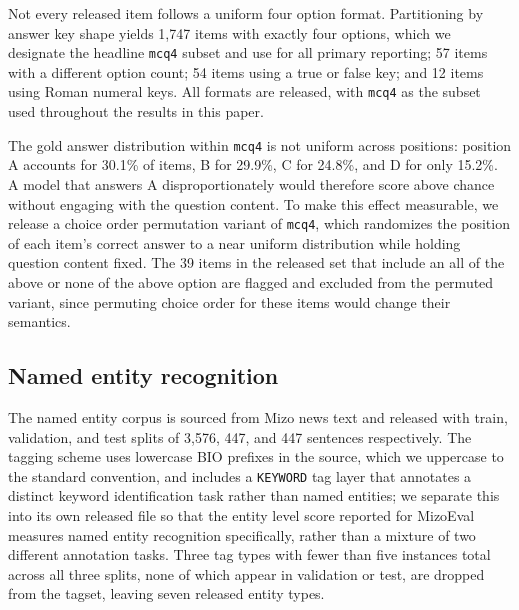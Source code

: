 \documentclass[11pt,a4paper]{article}
\begin{document}
Not every released item follows a uniform four option format. Partitioning by answer key shape yields 1,747 items with exactly four options, which we designate the headline \texttt{mcq4} subset and use for all primary reporting; 57 items with a different option count; 54 items using a true or false key; and 12 items using Roman numeral keys. All formats are released, with \texttt{mcq4} as the subset used throughout the results in this paper.

The gold answer distribution within \texttt{mcq4} is not uniform across positions: position A accounts for 30.1\% of items, B for 29.9\%, C for 24.8\%, and D for only 15.2\%. A model that answers A disproportionately would therefore score above chance without engaging with the question content. To make this effect measurable, we release a choice order permutation variant of \texttt{mcq4}, which randomizes the position of each item's correct answer to a near uniform distribution while holding question content fixed. The 39 items in the released set that include an all of the above or none of the above option are flagged and excluded from the permuted variant, since permuting choice order for these items would change their semantics.

\subsection{Named entity recognition}
\label{sec:ner-data}

The named entity corpus is sourced from Mizo news text and released with train, validation, and test splits of 3,576, 447, and 447 sentences respectively. The tagging scheme uses lowercase BIO prefixes in the source, which we uppercase to the standard convention, and includes a \texttt{KEYWORD} tag layer that annotates a distinct keyword identification task rather than named entities; we separate this into its own released file so that the entity level score reported for MizoEval measures named entity recognition specifically, rather than a mixture of two different annotation tasks. Three tag types with fewer than five instances total across all three splits, none of which appear in validation or test, are dropped from the tagset, leaving seven released entity types.
\end{document}
